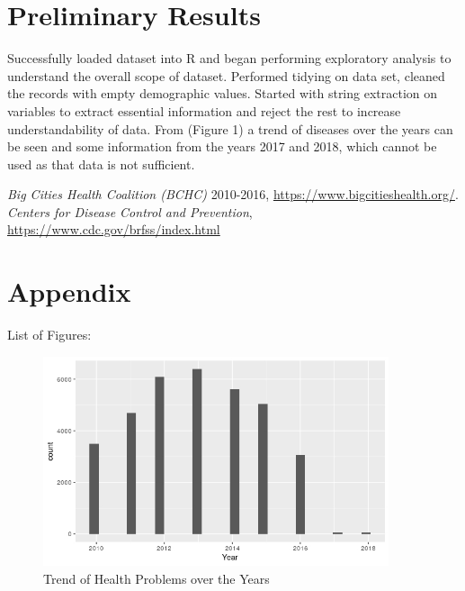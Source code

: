 \documentclass[11pt]{article}
\begin{document}
  \section{Preliminary Results}
  Successfully loaded dataset into R and began performing exploratory analysis to understand the overall scope of dataset.
  Performed tidying on data set, cleaned the records with empty demographic values. Started with string extraction on variables to extract essential information and reject the rest to increase understandability of data. From (Figure 1) a trend of diseases over the years can be seen and some information from the years 2017 and 2018, which cannot be used as that data is not sufficient.

  \begin{thebibliography}{9}
    \bibitem[1]{} \emph{Big Cities Health Coalition (BCHC)} 2010-2016,
    \url{https://www.bigcitieshealth.org/}. 
    \bibitem[2]{} \emph{Centers for Disease Control and Prevention},
    \url{https://www.cdc.gov/brfss/index.html}
  \end{thebibliography}

  \section{Appendix}
  
  List of Figures:
  
  \begin{figure}[H]
    \centering
    \includegraphics[width=4in]{"year_hist"}
    \caption{Trend of Health Problems over the Years}
  \end{figure}
\end{document}
